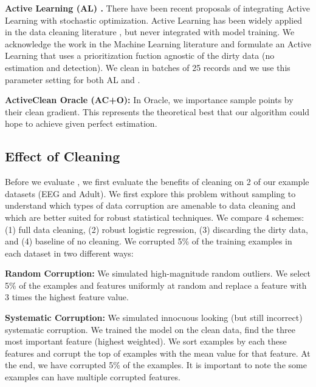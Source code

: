 \vspace{0.5em}

\noindent\textbf{Active Learning (AL) \cite{guillory2009active}. } There have been recent proposals of integrating Active Learning with stochastic optimization. Active Learning has been widely applied in the data cleaning literature \cite{gokhale2014corleone}, but never integrated with model training. We acknowledge the work in the Machine Learning literature and formulate an Active Learning that uses a prioritization fuction agnostic of the dirty data (no estimation and detection). We clean in batches of 25 records and we use this parameter setting for both AL and \sys.

\vspace{0.5em}

\noindent\textbf{ActiveClean Oracle (AC+O): } In \sys Oracle, we importance sample points by their clean gradient. This represents the theoretical best that our algorithm could hope to achieve given perfect estimation.

\subsection{Effect of Cleaning}
Before we evaluate \sys, we first evaluate the benefits of cleaning on 2 of our example datasets (EEG and Adult).
We first explore this problem without sampling to understand which types of data corruption are amenable to data cleaning and which are better suited for robust statistical techniques.
We compare 4 schemes: (1) full data cleaning, (2) robust logistic regression, (3) discarding the dirty data, and (4) baseline of no cleaning. We corrupted 5\% of the training examples in each dataset in two different ways:

\vspace{0.5em}

\noindent\textbf{Random Corruption: } We simulated high-magnitude random outliers. We select 5\% of the examples and features uniformly at random and replace a feature with 3 times the highest feature value.

\vspace{0.5em}

\noindent\textbf{Systematic Corruption: } We simulated innocuous looking (but still incorrect) systematic corruption. We trained the model on the clean data, find the three most important feature (highest weighted). We sort examples by each these features and corrupt the top of examples with the mean value for that feature. 
At the end, we have corrupted 5\% of the examples.
It is important to note the some examples can have multiple corrupted features.

